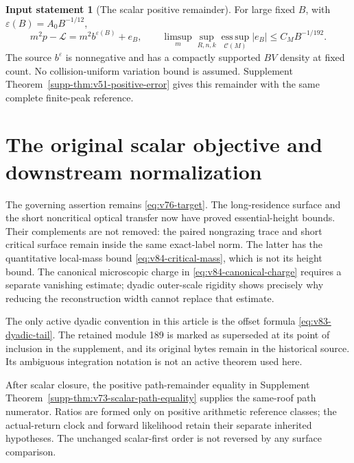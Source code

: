 \documentclass[11pt,reqno]{amsart}
\numberwithin{equation}{section}
\theoremstyle{definition}
\newtheorem{inputstatement}[theorem]{Input statement}
\theoremstyle{remark}\newtheorem{remark}[theorem]{Remark}
\newcommand{\esssup}{\operatorname*{ess\,sup}}
\begin{document}
\begin{inputstatement}[The scalar positive remainder]
\label{input:v83-scalar}
For large fixed $B$, with $\varepsilon(B)=A_0B^{-1/12}$,
\begin{equation}\label{eq:v76-remainder}
 m^2p-\mathcal L=m^2b^{\varepsilon(B)}+e_B,\qquad
 \limsup_m\sup_{R,n,k}\esssup_{\mathcal C(M)}|e_B|
                                      \le C_MB^{-1/192}.
\end{equation}
The source $b^\varepsilon$ is nonnegative and has a compactly supported
$BV$ density at fixed count. No collision-uniform variation bound is
assumed. Supplement Theorem~\ref{supp-thm:v51-positive-error} gives
this remainder with the same complete finite-peak reference.
\end{inputstatement}










\section{The original scalar objective and downstream normalization}
The governing assertion remains \eqref{eq:v76-target}. The long-residence
surface and the short noncritical optical transfer now have proved
essential-height bounds. Their complements are not removed: the
paired nongrazing trace and short critical surface remain inside the
same exact-label norm. The latter has the quantitative local-mass
bound \eqref{eq:v84-critical-mass}, which is not its height bound.
The canonical microscopic charge in \eqref{eq:v84-canonical-charge}
requires a separate vanishing estimate; dyadic outer-scale rigidity
shows precisely why reducing the reconstruction width cannot replace
that estimate.

The only active dyadic convention in this article is the offset formula
\eqref{eq:v83-dyadic-tail}. The retained module 189 is marked as
superseded at its point of inclusion in the supplement, and its original
bytes remain in the historical source. Its ambiguous integration
notation is not an active theorem used here.

After scalar closure, the positive path-remainder equality in
Supplement Theorem~\ref{supp-thm:v73-scalar-path-equality} supplies
the same-roof path numerator. Ratios are formed only on positive
arithmetic reference classes; the actual-return clock and forward
likelihood retain their separate inherited hypotheses. The unchanged
scalar-first order is not reversed by any surface comparison.

\appendix


\end{document}
